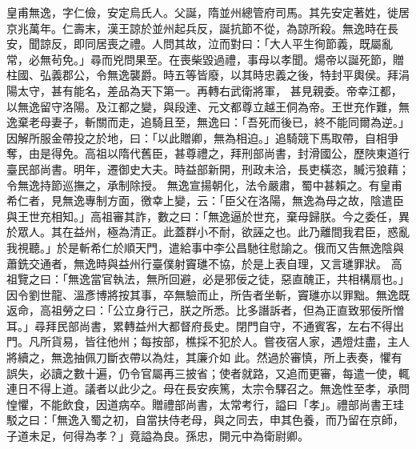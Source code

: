 \begin{pinyinscope}
 皇甫無逸，字仁儉，安定烏氏人。父誕，隋並州總管府司馬。其先安定著姓，徙居京兆萬年。仁壽末，漢王諒於並州起兵反，誕抗節不從，為諒所殺。無逸時在長安，聞諒反，即同居喪之禮。人問其故，泣而對曰：「大人平生徇節義，既屬亂常，必無茍免。」尋而兇問果至。在喪柴毀過禮，事母以孝聞。煬帝以誕死節，贈柱國、弘義郡公，令無逸襲爵。時五等皆廢，以其時忠義之後，特封平輿侯。拜涓陽太守，甚有能名，差品為天下第一。再轉右武衛將軍，
 甚見親委。帝幸江都，以無逸留守洛陽。及江都之變，與段達、元文都尊立越王侗為帝。王世充作難，無逸棄老母妻子，斬關而走，追騎且至，無逸曰：「吾死而後已，終不能同爾為逆。」因解所服金帶投之於地，曰：「以此贈卿，無為相迫。」追騎競下馬取帶，自相爭奪，由是得免。高祖以隋代舊臣，甚尊禮之，拜刑部尚書，封滑國公，歷陜東道行臺民部尚書。明年，遷御史大夫。時益部新開，刑政未洽，長吏橫恣，贓污狼藉；令無逸持節巡撫之，承制除授。
 無逸宣揚朝化，法令嚴肅，蜀中甚賴之。有皇甫希仁者，見無逸專制方面，徼幸上變，云：「臣父在洛陽，無逸為母之故，陰遣臣與王世充相知。」高祖審其詐，數之曰：「無逸逼於世充，棄母歸朕。今之委任，異於眾人。其在益州，極為清正。此蓋群小不耐，欲誣之也。此乃離間我君臣，惑亂我視聽。」於是斬希仁於順天門，遣給事中李公昌馳往慰諭之。俄而又告無逸陰與蕭銑交通者，無逸時與益州行臺僕射竇璡不協，於是上表自理，又言璡罪狀。
 高祖覽之曰：「無逸當官執法，無所回避，必是邪佞之徒，惡直醜正，共相構扇也。」因令劉世龍、溫彥博將按其事，卒無驗而止，所告者坐斬，竇璡亦以罪黜。無逸既返命，高祖勞之曰：「公立身行己，朕之所悉。比多譖訴者，但為正直致邪佞所憎耳。」尋拜民部尚書，累轉益州大都督府長史。閉門自守，不通賓客，左右不得出門。凡所貨易，皆往他州；每按部，樵採不犯於人。嘗夜宿人家，遇燈炷盡，主人將續之，無逸抽佩刀斷衣帶以為炷，其廉介如
 此。然過於審慎，所上表奏，懼有誤失，必讀之數十遍，仍令官屬再三披省；使者就路，又追而更審，每遣一使，輒連日不得上道。議者以此少之。母在長安疾篤，太宗令驛召之。無逸性至孝，承問惶懼，不能飲食，因道病卒。贈禮部尚書，太常考行，謚曰「孝」。禮部尚書王珪駁之曰：「無逸入蜀之初，自當扶侍老母，與之同去，申其色養，而乃留在京師，子道未足，何得為孝？」竟謚為良。孫忠，開元中為衛尉卿。




\end{pinyinscope}
